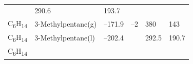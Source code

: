 \documentclass[
  9pt,
]{extbook}
\theoremstyle{definition}
\theoremstyle{definition}
\theoremstyle{definition}
\theoremstyle{remark}
\begin{document}
\begin{longtable}[]{@{}llllll@{}}
\begin{minipage}[t]{0.15\columnwidth}
\strut
\end{minipage} & \begin{minipage}[t]{0.14\columnwidth}\raggedright
290.6\strut
\end{minipage} & \begin{minipage}[t]{0.14\columnwidth}\raggedright
193.7\strut
\end{minipage}\tabularnewline
\begin{minipage}[t]{0.07\columnwidth}\raggedright
C\textsubscript{6}H\textsubscript{14}\strut
\end{minipage} & \begin{minipage}[t]{0.17\columnwidth}\raggedright
3-Methylpentane(g)\strut
\end{minipage} & \begin{minipage}[t]{0.15\columnwidth}\raggedright
--171.9\strut
\end{minipage} & \begin{minipage}[t]{0.15\columnwidth}\raggedright
--2\strut
\end{minipage} & \begin{minipage}[t]{0.14\columnwidth}\raggedright
380\strut
\end{minipage} & \begin{minipage}[t]{0.14\columnwidth}\raggedright
143\strut
\end{minipage}\tabularnewline
\begin{minipage}[t]{0.07\columnwidth}\raggedright
C\textsubscript{6}H\textsubscript{14}\strut
\end{minipage} & \begin{minipage}[t]{0.17\columnwidth}\raggedright
3-Methylpentane(l)\strut
\end{minipage} & \begin{minipage}[t]{0.15\columnwidth}\raggedright
--202.4\strut
\end{minipage} & \begin{minipage}[t]{0.15\columnwidth}\raggedright
\strut
\end{minipage} & \begin{minipage}[t]{0.14\columnwidth}\raggedright
292.5\strut
\end{minipage} & \begin{minipage}[t]{0.14\columnwidth}\raggedright
190.7\strut
\end{minipage}\tabularnewline
\begin{minipage}[t]{0.07\columnwidth}\raggedright
C\textsubscript{6}H\textsubscript{14}\strut
\end{minipage} & \begin{minipage}[t]{0.17\columnwidth}\raggedright

\end{minipage}
\end{longtable}
\end{document}
